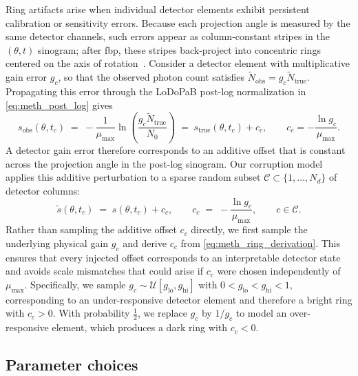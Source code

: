 Ring artifacts arise when individual detector elements exhibit persistent calibration or sensitivity errors. Because each projection angle is measured by the same detector channels, such errors appear as column-constant stripes in the $(\theta,t)$ sinogram; after \gls{fbp}, these stripes back-project into concentric rings centered on the axis of rotation~\cite{Sijbers2004, Prell2009}. Consider a detector element with multiplicative gain error $g_c$, so that the observed photon count satisfies $\tilde{N}_{\text{obs}} = g_c \tilde{N}_{\text{true}}$. Propagating this error through the LoDoPaB post-log normalization in \eqref{eq:meth_post_log} gives
\begin{equation}
    s_{\text{obs}}(\theta, t_c)
    \;=\; -\frac{1}{\mu_{\max}}\ln\!\left(\frac{g_c \tilde{N}_{\text{true}}}{N_0}\right)
    \;=\; s_{\text{true}}(\theta, t_c) + c_c,
    \qquad
    c_c = -\frac{\ln g_c}{\mu_{\max}}.
    \label{eq:meth_ring_derivation}
\end{equation}
A detector gain error therefore corresponds to an additive offset that is constant across the projection angle in the post-log sinogram. Our corruption model applies this additive perturbation to a sparse random subset $\mathcal{C} \subset \{1,\dots,N_d\}$ of detector columns:
\begin{equation}
    \tilde{s}(\theta, t_c) \;=\; s(\theta, t_c) + c_c,
    \qquad
    c_c \;=\; -\frac{\ln g_c}{\mu_{\max}},
    \qquad
    c \in \mathcal{C}.
    \label{eq:meth_ring}
\end{equation}
Rather than sampling the additive offset $c_c$ directly, we first sample the underlying physical gain $g_c$ and derive $c_c$ from \eqref{eq:meth_ring_derivation}. This ensures that every injected offset corresponds to an interpretable detector state and avoids scale mismatches that could arise if $c_c$ were chosen independently of $\mu_{\max}$. Specifically, we sample $g_c \sim \mathcal{U}[g_{\text{lo}}, g_{\text{hi}}]$ with $0 < g_{\text{lo}} < g_{\text{hi}} < 1$, corresponding to an under-responsive detector element and therefore a bright ring with $c_c > 0$. With probability $\tfrac{1}{2}$, we replace $g_c$ by $1/g_c$ to model an over-responsive element, which produces a dark ring with $c_c < 0$.

\subsection{Parameter choices}

